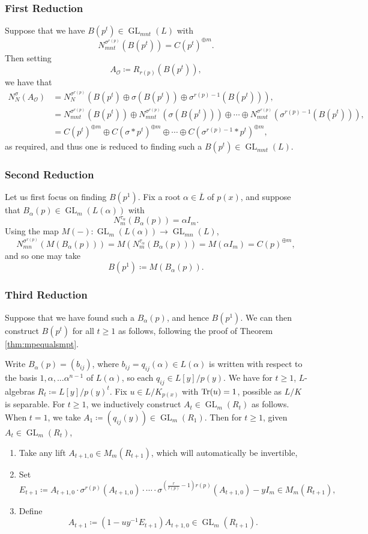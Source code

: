 \documentclass[10pt, reqno, hidelinks]{amsart}
\newcommand{\OO}{\mathcal{O}}
\DeclareMathOperator{\GL}{GL}
\numberwithin{thm}{subsection}
\theoremstyle{definition}
\begin{document}
\subsubsection*{First Reduction} Suppose that we have $B(p^t) \in \GL_{mnt}(L)$ with 
\[
N^{\sigma^{r(p)}}_{mnt}(B(p^t)) = C(p^t)^{\oplus m}.
\] 
Then setting
\[
A_{\OO} \coloneqq R_{r(p)}(B(p^t)),
\]
we have that
\begin{align*}
N^{\sigma}_{N}(A_{\OO}) &= N^{\sigma^{r(p)}}_{N}(B(p^t) \oplus \sigma(B(p^t)) \oplus \sigma^{r(p) - 1}(B(p^t))), \\
&= N^{\sigma^{r(p)}}_{mnt}(B(p^t)) \oplus N^{\sigma^{r(p)}}_{mnt}(\sigma(B(p^t))) \oplus \cdots \oplus N^{\sigma^{r(p)}}_{mnt}(\sigma^{r(p) - 1}(B(p^t))), \\
&=  C(p^t)^{\oplus m} \oplus C(\sigma * p^t)^{\oplus m} \oplus \cdots \oplus C(\sigma^{r(p) - 1} * p^t)^{\oplus m},
\end{align*}
as required, and thus one is reduced to finding such a $B(p^t) \in \GL_{mnt}(L)$.

\subsubsection*{Second Reduction} Let us first focus on finding $B(p^1)$. Fix a root $\alpha \in \overline{L}$ of $p(x)$, and suppose that $B_{\alpha}(p) \in \GL_{m}(L(\alpha))$ with
\[
N_{m}^{\tau_{\alpha}}(B_{\alpha}(p)) = \alpha I_m.
\]
Using the map $M(-) \colon \GL_m(L(\alpha)) \rightarrow \GL_{mn}(L)$, 
\[
N_{mn}^{\sigma^{r(p)}}(M(B_{\alpha}(p))) = M(N_{m}^{\tau_{\alpha}}(B_{\alpha}(p))) = M(\alpha I_m) = C(p)^{\oplus m},
\]
and so one may take
\[
B(p^1) \coloneqq M(B_{\alpha}(p)).
\]

\subsubsection*{Third Reduction} Suppose that we have found such a $B_{\alpha}(p)$, and hence $B(p^1)$. We can then construct $B(p^t)$ for all $t \geq 1$ as follows, following the proof of Theorem \ref{thm:mpequalsmpt}.

Write $B_{\alpha}(p) = (b_{ij})$, where $b_{ij} = q_{ij}(\alpha) \in L(\alpha)$ is written with respect to the basis $1, \alpha, ... \alpha^{n-1}$ of $L(\alpha)$, so each $q_{ij} \in L[y]/p(y)$.  We have for $t \geq 1$, $L$-algebras $R_t \coloneqq L[y] / p(y)^t$. Fix $u \in L / K_{p(x)}$ with $\Tr(u) = 1$, possible as $L / K$ is separable. For $t \geq 1$, we inductively construct $A_t \in \GL_m(R_t)$ as follows. When $t = 1$, we take $A_1 \coloneqq (q_{ij}(y)) \in \GL_m(R_1)$. Then for $t \geq 1$, given $A_t \in \GL_m(R_t)$,
\begin{enumerate}
	\item Take any lift $A_{t+1,0} \in M_m(R_{t+1})$, which will automatically be invertible,
	\item Set
	\[
		E_{t+1} \coloneqq A_{t+1,0} \cdot \sigma^{r(p)}(A_{t+1, 0}) \cdot \cdots  \cdot \sigma^{(\frac{r}{r(p)}-1)r(p)}(A_{t+1, 0}) - y I_m \in M_m(R_{t+1}),
	\]
	\item Define
	\[
	A_{t+1} \coloneqq (1 - u y^{-1}E_{t+1})A_{t+1, 0} \in \GL_m(R_{t+1}).
	\]
\end{enumerate}
\end{document}

